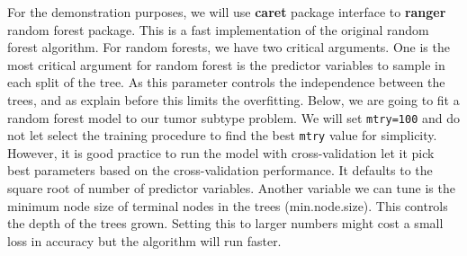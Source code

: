 \documentclass[12pt,]{krantz}
\newenvironment{Shaded}{\begin{snugshade}}{\end{snugshade}}
\newcommand{\CommentTok}[1]{\textcolor[rgb]{0.56,0.35,0.01}{\textit{#1}}}
\newcommand{\DataTypeTok}[1]{\textcolor[rgb]{0.13,0.29,0.53}{#1}}
\newcommand{\DecValTok}[1]{\textcolor[rgb]{0.00,0.00,0.81}{#1}}
\newcommand{\KeywordTok}[1]{\textcolor[rgb]{0.13,0.29,0.53}{\textbf{#1}}}
\newcommand{\NormalTok}[1]{#1}
\newcommand{\OperatorTok}[1]{\textcolor[rgb]{0.81,0.36,0.00}{\textbf{#1}}}
\newcommand{\StringTok}[1]{\textcolor[rgb]{0.31,0.60,0.02}{#1}}
\begin{document}
For the demonstration purposes, we will use \textbf{caret} package interface to \textbf{ranger} random forest package. This is a fast implementation of the original random forest algorithm. For random forests, we have two critical arguments. One is the most critical argument for random forest is the predictor variables to sample in each split of the tree. As this parameter controls the independence between the trees, and as explain before this limits the overfitting. Below, we are going to fit a random forest model to our tumor subtype problem. We will set \texttt{mtry=100} and do not let select the training procedure to find the best \texttt{mtry} value for simplicity. However, it is good practice
to run the model with cross-validation let it pick best parameters based on the cross-validation performance. It defaults to the square root of number of predictor variables. Another variable we can tune is the minimum node size of terminal nodes in the trees (min.node.size). This controls the depth of the trees grown. Setting this to larger numbers might cost a small loss in accuracy but the algorithm will run faster.

\begin{Shaded}
\end{Shaded}
\end{document}
